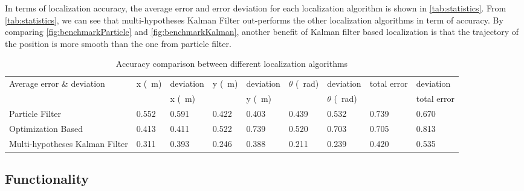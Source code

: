 

In terms of localization accuracy, the average error and error deviation for each localization algorithm is shown in \autoref{tab:statistics}. From \autoref{tab:statistics}, we can see that multi-hypotheses Kalman Filter out-performs the other localization algorithms in term of accuracy. By comparing \autoref{fig:benchmarkParticle} and \autoref{fig:benchmarkKalman}, another benefit of  Kalman filter based localization is that the trajectory of the position is more smooth than the one from particle filter.
\begin{table}[h!]
  \centering
  \caption{Accuracy comparison between different localization algorithms}
  \label{tab:statistics}
  \begin{adjustbox}{max width=\textwidth}
    \begin{tabular}{l|l|l|l|l|l|l|l|l}
      Average error  \& deviation & x (\SI{}{\meter})                   &  deviation     & y  (\SI{}{\meter})                   & deviation        & $\theta$  (\SI{}{\radian})            &deviation    & total error         &deviation           \\
      &                     & x (\SI{}{\meter})&                     &  y (\SI{}{\meter})&                     &  $\theta$ (\SI{}{\radian}) &                     & total error\\ \hline
      Particle Filter                & 0.552& 0.591 & 0.422 & 0.403 & 0.439 & 0.532 & 0.739 & 0.670   \\ \hline
      Optimization Based            & 0.413 & 0.411 & 0.522 & 0.739 & 0.520 & 0.703 & 0.705 & 0.813   \\ \hline
      Multi-hypotheses Kalman Filter & 0.311 & 0.393 & 0.246 & 0.388 & 0.211 & 0.239 & 0.420 & 0.535  
    \end{tabular}
  \end{adjustbox}
\end{table}

\subsection{Functionality}
\label{sub:Functionality}

